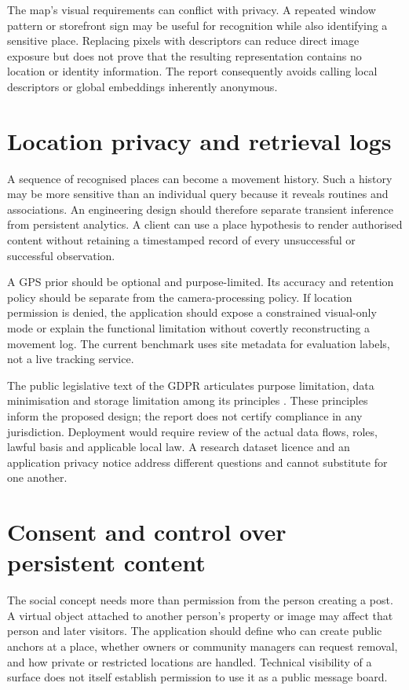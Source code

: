 The map's visual requirements can conflict with privacy. A repeated window pattern or storefront sign may be useful for recognition while also identifying a sensitive place. Replacing pixels with descriptors can reduce direct image exposure but does not prove that the resulting representation contains no location or identity information. The report consequently avoids calling local descriptors or global embeddings inherently anonymous.

\section{Location privacy and retrieval logs}
A sequence of recognised places can become a movement history. Such a history may be more sensitive than an individual query because it reveals routines and associations. An engineering design should therefore separate transient inference from persistent analytics. A client can use a place hypothesis to render authorised content without retaining a timestamped record of every unsuccessful or successful observation.

A GPS prior should be optional and purpose-limited. Its accuracy and retention policy should be separate from the camera-processing policy. If location permission is denied, the application should expose a constrained visual-only mode or explain the functional limitation without covertly reconstructing a movement log. The current benchmark uses site metadata for evaluation labels, not a live tracking service.

The public legislative text of the GDPR articulates purpose limitation, data minimisation and storage limitation among its principles \citep{gdpr}. These principles inform the proposed design; the report does not certify compliance in any jurisdiction. Deployment would require review of the actual data flows, roles, lawful basis and applicable local law. A research dataset licence and an application privacy notice address different questions and cannot substitute for one another.

\section{Consent and control over persistent content}
The social concept needs more than permission from the person creating a post. A virtual object attached to another person's property or image may affect that person and later visitors. The application should define who can create public anchors at a place, whether owners or community managers can request removal, and how private or restricted locations are handled. Technical visibility of a surface does not itself establish permission to use it as a public message board.

